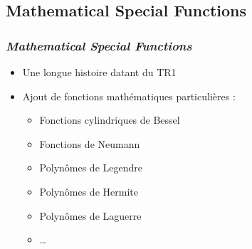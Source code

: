 \documentclass[C++.tex]{subfiles}
\begin{document}
\subsection*{Mathematical Special Functions}
\begin{frame}[fragile]
	\frametitle{\textit{Mathematical Special Functions}}
	\begin{itemize}
		\item Une longue histoire datant du TR1
		\item Ajout de fonctions mathématiques particulières :
		\begin{itemize}
			\item Fonctions cylindriques de Bessel
			\item Fonctions de Neumann
			\item Polynômes de Legendre
			\item Polynômes de Hermite
			\item Polynômes de Laguerre
			\item \ldots
		\end{itemize}
	\end{itemize}
\end{frame}
\end{document}
